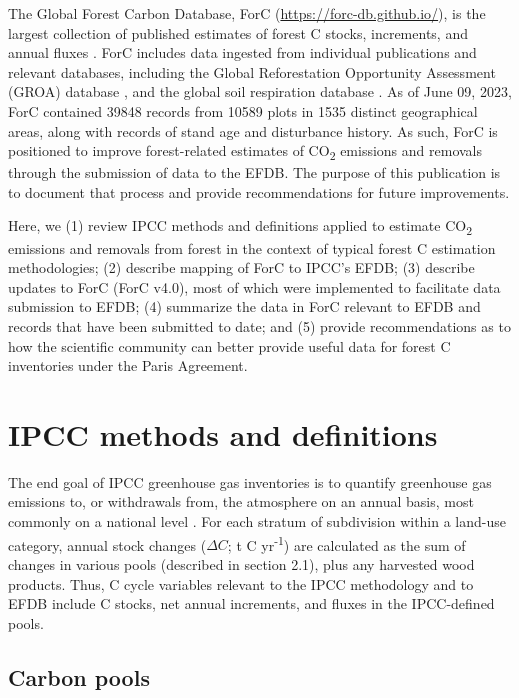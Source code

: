 \documentclass[, manuscript]{copernicus}
\begin{document}
The Global Forest Carbon Database, ForC
(\url{https://forc-db.github.io/}), is the largest collection of
published estimates of forest C stocks, increments, and annual fluxes
\citep{anderson-teixeira_forc_2018, anderson-teixeira_carbon_2021}. ForC
includes data ingested from individual publications and relevant
databases, including the Global Reforestation Opportunity Assessment
(GROA) database \citep[database doi:
10.5281/zenodo.3983644]{cook-patton_mapping_2020}, and the global soil
respiration database
\citep[SRDB-V5,][]{bond-lamberty_global_2010, jian_restructured_2021}.
As of June 09, 2023, ForC contained 39848 records from 10589 plots in
1535 distinct geographical areas, along with records of stand age and
disturbance history. As such, ForC is positioned to improve
forest-related estimates of CO\textsubscript{2} emissions and removals
through the submission of data to the EFDB. The purpose of this
publication is to document that process and provide recommendations for
future improvements.

Here, we (1) review IPCC methods and definitions applied to estimate
CO\textsubscript{2} emissions and removals from forest in the context of
typical forest C estimation methodologies; (2) describe mapping of ForC
to IPCC's EFDB; (3) describe updates to ForC (ForC v4.0), most of which
were implemented to facilitate data submission to EFDB; (4) summarize
the data in ForC relevant to EFDB and records that have been submitted
to date; and (5) provide recommendations as to how the scientific
community can better provide useful data for forest C inventories under
the Paris Agreement.

\section{IPCC methods and definitions}

The end goal of IPCC greenhouse gas inventories is to quantify
greenhouse gas emissions to, or withdrawals from, the atmosphere on an
annual basis, most commonly on a national level
\citep{ipcc_2006_2006, ipcc_2019_2019}. For each stratum of subdivision
within a land-use category, annual stock changes (\(\Delta C\); t C
yr\textsuperscript{-1}) are calculated as the sum of changes in various
pools (described in section 2.1), plus any harvested wood products.
Thus, C cycle variables relevant to the IPCC methodology and to EFDB
include C stocks, net annual increments, and fluxes in the IPCC-defined
pools.

\subsection{Carbon pools}
\end{document}
